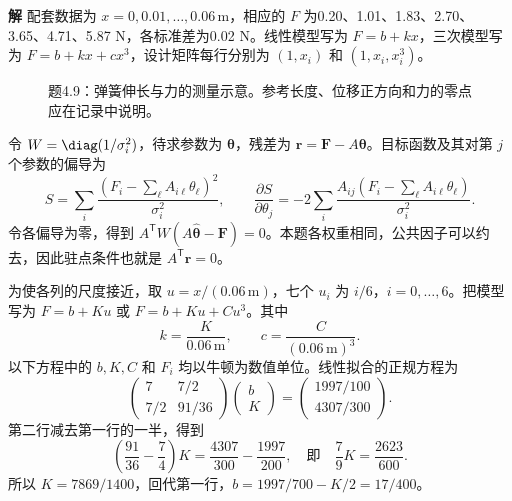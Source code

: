 \documentclass[11pt,openany,fontset=fandol]{ctexbook}
\theoremstyle{plain}\newtheorem{theorem}{定理}[chapter]\newtheorem{proposition}[theorem]{命题}
\theoremstyle{definition}\newtheorem{definition}{定义}[chapter]\newtheorem{example}{例}[chapter]
\theoremstyle{remark}\newtheorem*{remark}{说明}
\newcommand{\SolutionStart}{\par\nobreak\medskip\nobreak\noindent\textbf{解}\quad\ignorespaces}
\newenvironment{solution}{\SolutionStart}{\par\medskip}
\newcommand{\vct}[1]{\bm{#1}}\newcommand{\Rea}{\operatorname{Re}}\newcommand{\Ima}{\operatorname{Im}}
\begin{document}
\begin{enumerate}[label=4.\arabic*,itemsep=3pt]
\begin{solution}
配套数据为 $x=0,0.01,\ldots,0.06\,\mathrm m$，相应的 $F$ 为0.20、1.01、1.83、2.70、3.65、4.71、5.87 N，各标准差为0.02 N。线性模型写为 $F=b+kx$，三次模型写为 $F=b+kx+cx^3$，设计矩阵每行分别为 $(1,x_i)$ 和 $(1,x_i,x_i^3)$。

\begin{figure}[H]\centering
{}
\caption{题4.9：弹簧伸长与力的测量示意。参考长度、位移正方向和力的零点应在记录中说明。}\label{fig:ex-4-9}
\end{figure}

令 $W=\diag(1/\sigma_i^2)$，待求参数为 $\vct\theta$，残差为 $\vct r=\vct F-A\vct\theta$。目标函数及其对第 $j$ 个参数的偏导为
\[
S=\sum_i\frac{(F_i-\sum_\ell A_{i\ell}\theta_\ell)^2}{\sigma_i^2},
\qquad
\frac{\partial S}{\partial\theta_j}
=-2\sum_i\frac{A_{ij}(F_i-\sum_\ell A_{i\ell}\theta_\ell)}{\sigma_i^2}.
\]
令各偏导为零，得到 $A^{\mathsf T}W(A\hat{\vct\theta}-\vct F)=0$。本题各权重相同，公共因子可以约去，因此驻点条件也就是 $A^{\mathsf T}\vct r=0$。

为使各列的尺度接近，取 $u=x/(0.06\,\mathrm m)$，七个 $u_i$ 为 $i/6$，$i=0,\ldots,6$。把模型写为 $F=b+Ku$ 或 $F=b+Ku+Cu^3$。其中
\[
k=\frac{K}{0.06\,\mathrm m},\qquad
c=\frac{C}{(0.06\,\mathrm m)^3}.
\]
以下方程中的 $b,K,C$ 和 $F_i$ 均以牛顿为数值单位。线性拟合的正规方程为
\[
\begin{pmatrix}7&7/2\\7/2&91/36\end{pmatrix}
\begin{pmatrix}b\\K\end{pmatrix}
=\begin{pmatrix}1997/100\\4307/300\end{pmatrix}.
\]
第二行减去第一行的一半，得到
\[
\left(\frac{91}{36}-\frac74\right)K
=\frac{4307}{300}-\frac{1997}{200},
\quad\text{即}\quad
\frac79K=\frac{2623}{600}.
\]
所以 $K=7869/1400$，回代第一行，$b=1997/700-K/2=17/400$。


\end{solution}
\end{enumerate}
\end{document}
